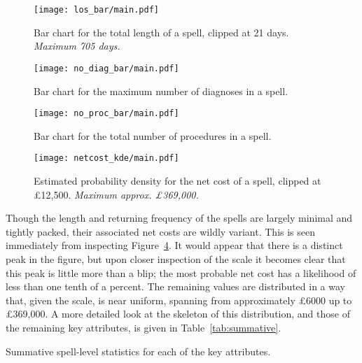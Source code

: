 \begin{figure}[htbp]
    \centering
    \texttt{[image: los\_bar/main.pdf]}
    \caption{Bar chart for the total length of a spell, clipped at 21 days.
        \textit{Maximum 705 days.}}%
    \label{fig:los_bar}
\end{figure}

\begin{figure}[htbp]
    \centering
    \texttt{[image: no\_diag\_bar/main.pdf]}
    \caption{Bar chart for the maximum number of diagnoses in a spell.}%
    \label{fig:no_diag_bar}
\end{figure}

\begin{figure}[htbp]
    \centering
    \texttt{[image: no\_proc\_bar/main.pdf]}
    \caption{Bar chart for the total number of procedures in a spell.}%
    \label{fig:no_proc_bar}
\end{figure}

\begin{figure}[htbp]
    \centering
    \texttt{[image: netcost\_kde/main.pdf]}
    \caption{Estimated probability density for the net cost of a spell, clipped
        at \pounds12,500. \textit{Maximum approx. \pounds369,000.}}%
    \label{fig:netcost_kde}
\end{figure}

Though the length and returning frequency of the spells are largely minimal and
tightly packed, their associated net costs are wildly variant. This is seen
immediately from inspecting Figure~\ref{fig:netcost_kde}. It would appear that
there is a distinct peak in the figure, but upon closer inspection of the scale
it becomes clear that this peak is little more than a blip; the most probable
net cost has a likelihood of less than one tenth of a percent. The remaining
values are distributed in a way that, given the scale, is near uniform, spanning
from approximately \pounds6000 up to \pounds369,000. A more detailed look at the
skeleton of this distribution, and those of the remaining key attributes, is
given in Table~\ref{tab:summative}.

\begin{table}[htbp]
    \resizebox{\imgwidth}{!}{%
        
    }

    \vspace{5pt}

    \resizebox{\imgwidth}{!}{%
        
    }

    \vspace{5pt}
    
    \resizebox{\imgwidth}{!}{%
        
    }
    \caption{Summative spell-level statistics for each of the key attributes.}%
    \label{tab:summative}
\end{table}


